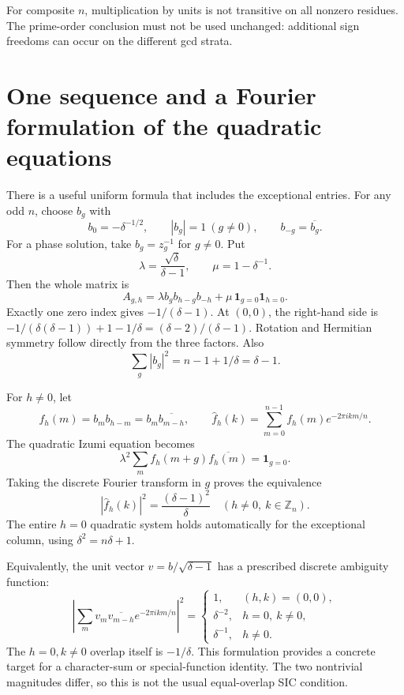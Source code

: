 \documentclass[11pt,reqno]{amsart}
\theoremstyle{plain}
\begin{document}
For composite \(n\), multiplication by units is not transitive on
all nonzero residues. The prime-order conclusion must not be used
unchanged: additional sign freedoms can occur on the different gcd
strata.

\section{One sequence and a Fourier formulation of the quadratic equations}\label{sec:31}

There is a useful uniform formula that includes the exceptional entries.
For any odd \(n\), choose \(b_g\) with
\[
 b_0=-\delta^{-1/2},\qquad |b_g|=1\ (g\ne0),\qquad
 b_{-g}=\overline{b_g}.
\]
For a phase solution, take \(b_g=z_g^{-1}\) for \(g\ne0\).
Put
\[
 \lambda=\frac{\sqrt\delta}{\delta-1},\qquad
 \mu=1-\delta^{-1}.
\]
Then the whole matrix is
\begin{equation*}
 \boxed{
 A_{g,h}=\lambda b_gb_{h-g}b_{-h}
            +\mu\,\mathbf1_{g=0}\mathbf1_{h=0}.
 }
 \tag{31.1}
\end{equation*}
Exactly one zero index gives \(-1/(\delta-1)\). At \((0,0)\), the
right-hand side is
\(-1/(\delta(\delta-1))+1-1/\delta=(\delta-2)/(\delta-1)\).
Rotation and Hermitian symmetry follow directly from the three factors.
Also
\[
 \sum_g|b_g|^2=n-1+1/\delta=\delta-1.
\]

For \(h\ne0\), let
\[
 f_h(m)=b_mb_{h-m}=b_m\overline{b_{m-h}},\qquad
 \widehat f_h(k)=\sum_{m=0}^{n-1}f_h(m)e^{-2\pi i km/n}.
\]
The quadratic Izumi equation becomes
\[
 \lambda^2\sum_m f_h(m+g)\overline{f_h(m)}=\mathbf1_{g=0}.
\]
Taking the discrete Fourier transform in \(g\) proves the equivalence
\begin{equation*}
 \boxed{
 |\widehat f_h(k)|^2=\frac{(\delta-1)^2}{\delta}
 \quad(h\ne0,\ k\in\mathbb Z_n).
 }
 \tag{Q}
\end{equation*}
The entire \(h=0\) quadratic system holds automatically for the
exceptional column, using \(\delta^2=n\delta+1\).

Equivalently, the unit vector \(v=b/\sqrt{\delta-1}\) has a prescribed
discrete ambiguity function:
\begin{equation*}
 \left|\sum_m v_m\overline{v_{m-h}}e^{-2\pi i km/n}\right|^2
 =\begin{cases}
 1,&(h,k)=(0,0),\\
 \delta^{-2},&h=0,\ k\ne0,\\
 \delta^{-1},&h\ne0.
 \end{cases}
 \tag{31.2}
\end{equation*}
The \(h=0,k\ne0\) overlap itself is \(-1/\delta\). This formulation
provides a concrete target for a character-sum or special-function
identity. The two nontrivial magnitudes differ, so this is not the
usual equal-overlap SIC condition.
\end{document}
